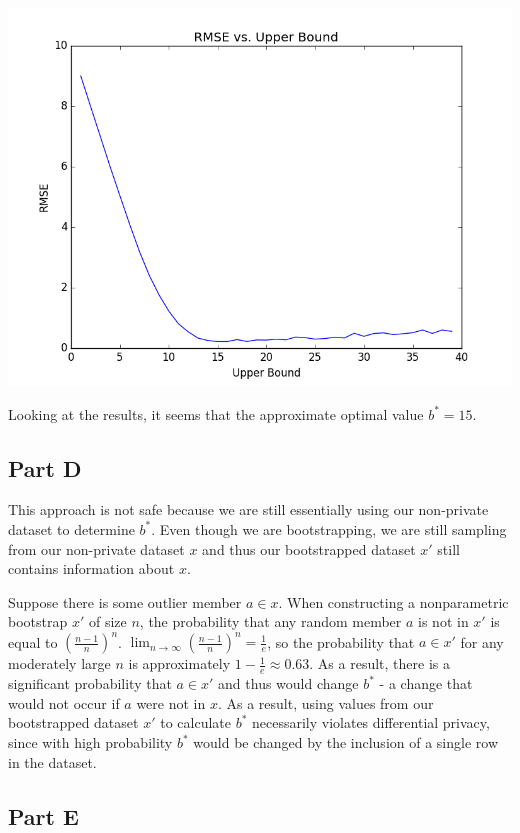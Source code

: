 \documentclass[12pt]{article}
\begin{document}
\includegraphics[scale=0.6]{problem_2.png}

Looking at the results, it seems that the approximate optimal value $b^* = 15$.

\subsection{Part D}

\noindent

This approach is not safe because we are still essentially using our non-private dataset to determine $b^*$. Even though we are bootstrapping, we are still sampling from our non-private dataset $x$ and thus our bootstrapped dataset $x'$ still contains information about $x$.

\medskip

Suppose there is some outlier member $a \in x$. When constructing a nonparametric bootstrap $x'$ of size $n$, the probability that any random member $a$ is not in $x'$ is equal to $(\frac{n-1}{n})^n$. $\lim_{n \to \infty} (\frac{n-1}{n})^n = \frac{1}{e}$, so the probability that $a \in x'$ for any moderately large $n$ is approximately $1 - \frac{1}{e} \approx 0.63$. As a result, there is a significant probability that $a \in x'$ and thus would change $b^*$ - a change that would not occur if $a$ were not in $x$. As a result, using values from our bootstrapped dataset $x'$ to calculate $b^*$ necessarily violates differential privacy, since with high probability $b^*$ would be changed by the inclusion of a single row in the dataset.

\subsection{Part E}
\end{document}
